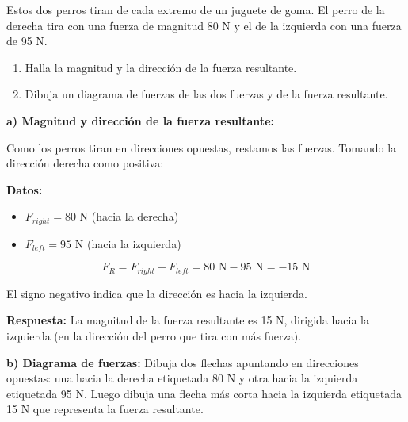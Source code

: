 \begin{exercise}
    Estos dos perros tiran de cada extremo de un juguete de goma.
    El perro de la derecha tira con una fuerza de magnitud 80 N y el de la izquierda con una fuerza de 95 N.
    \begin{enumerate}[label=\letraminuscula]
        \item Halla la magnitud y la dirección de la fuerza resultante.
        \item Dibuja un diagrama de fuerzas de las dos fuerzas y
        de la fuerza resultante.
    \end{enumerate}


    \begin{solu}
        \textbf{a) Magnitud y dirección de la fuerza resultante:}

        Como los perros tiran en direcciones opuestas, restamos las fuerzas. Tomando la dirección derecha como positiva:

        \textbf{Datos:}
        \begin{itemize}
            \item $F_{right} = 80$ N (hacia la derecha)
            \item $F_{left} = 95$ N (hacia la izquierda)
        \end{itemize}

        $$F_R = F_{right} - F_{left} = 80\text{ N} - 95\text{ N} = -15\text{ N}$$

        El signo negativo indica que la dirección es hacia la izquierda.

        \textbf{Respuesta:} La magnitud de la fuerza resultante es 15 N, dirigida hacia la izquierda (en la dirección del perro que tira con más fuerza).

        \textbf{b) Diagrama de fuerzas:} Dibuja dos flechas apuntando en direcciones opuestas: una hacia la derecha etiquetada 80 N y otra hacia la izquierda etiquetada 95 N. Luego dibuja una flecha más corta hacia la izquierda etiquetada 15 N que representa la fuerza resultante.
    \end{solu}
\end{exercise}




